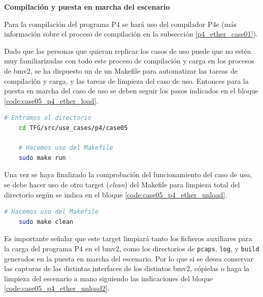 \vspace{0.5cm}
\textbf{Compilación y puesta en marcha del escenario}\\
\par

Para la compilación del programa P4 se hará uso del compilador P4c (más información sobre el proceso de compilación en la subsección \ref{p4_ether_case01}).\\
\par

Dado que las personas que quieran replicar los casos de uso puede que no estén muy familiarizadas con todo este proceso de compilación y carga en los procesos de \gls{bmv2}, se ha dispuesto un de un Makefile para automatizar las tareas de compilación y carga, y las tareas de limpieza del caso de uso. Entonces para la puesta en marcha del caso de uso se deben seguir los pasos indicados en el bloque \ref{code:case05_p4_ether_load}.

\begin{lstlisting}[language= bash, style=Consola, caption={Compilación programa P4 y puesta en marcha del escenario - Case05},label=code:case05_p4_ether_load]
    # Entramos al directorio 
    cd TFG/src/use_cases/p4/case05

    # Hacemos uso del Makefile
    sudo make run
\end{lstlisting}
\vspace{0.5cm}

Una vez se haya finalizado la comprobación del funcionamiento del caso de uso, se debe hacer uso de otro target (\textit{clean}) del Makefile para limpieza total del directorio según se indica en el bloque \ref{code:case05_p4_ether_unload}.

\begin{lstlisting}[language= bash, style=Consola, caption={Limpieza del escenario P4 - Case05},label=code:case05_p4_ether_unload]
    # Hacemos uso del Makefile
    sudo make clean
\end{lstlisting}
\vspace{0.5cm}

Es importante señalar que este target limpiará tanto los ficheros auxiliares para la carga del programa P4 en el \gls{bmv2}, como los directorios de \texttt{pcaps}, \texttt{log}, y \texttt{build} generados en la puesta en marcha del escenario. Por lo que si se desea conservar las capturas de las distintas interfaces de los distintos \gls{bmv2}, cópielas o haga la limpieza del escenario a mano siguiendo las indicaciones del bloque \ref{code:case05_p4_ether_unload2}.\\
\par

